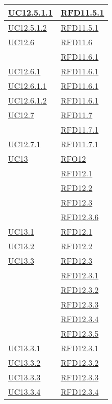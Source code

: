 \begin{longtable}{|>{\centering}m{5cm}|m{5cm}<{\centering}|}
\hyperref[UC12.5.1.1]{UC12.5.1.1} & \hyperlink{RFD11.5.1}{RFD11.5.1}\\ \hline
\hyperref[UC12.5.1.2]{UC12.5.1.2} & \hyperlink{RFD11.5.1}{RFD11.5.1}\\ \hline
\hyperref[UC12.6]{UC12.6} & \hyperlink{RFD11.6}{RFD11.6}\\
& \hyperlink{RFD11.6.1}{RFD11.6.1}\\ \hline
\hyperref[UC12.6.1]{UC12.6.1} & \hyperlink{RFD11.6.1}{RFD11.6.1}\\ \hline
\hyperref[UC12.6.1.1]{UC12.6.1.1} & \hyperlink{RFD11.6.1}{RFD11.6.1}\\ \hline
\hyperref[UC12.6.1.2]{UC12.6.1.2} & \hyperlink{RFD11.6.1}{RFD11.6.1}\\ \hline
\hyperref[UC12.7]{UC12.7} & \hyperlink{RFD11.7}{RFD11.7}\\
& \hyperlink{RFD11.7.1}{RFD11.7.1}\\ \hline
\hyperref[UC12.7.1]{UC12.7.1} & \hyperlink{RFD11.7.1}{RFD11.7.1}\\ \hline
\hyperref[UC13]{UC13} & \hyperlink{RFO12}{RFO12}\\
& \hyperlink{RFD12.1}{RFD12.1}\\
& \hyperlink{RFD12.2}{RFD12.2}\\
& \hyperlink{RFD12.3}{RFD12.3}\\
& \hyperlink{RFD12.3.6}{RFD12.3.6}\\ \hline
\hyperref[UC13.1]{UC13.1} & \hyperlink{RFD12.1}{RFD12.1}\\ \hline
\hyperref[UC13.2]{UC13.2} & \hyperlink{RFD12.2}{RFD12.2}\\ \hline
\hyperref[UC13.3]{UC13.3} & \hyperlink{RFD12.3}{RFD12.3}\\
& \hyperlink{RFD12.3.1}{RFD12.3.1}\\
& \hyperlink{RFD12.3.2}{RFD12.3.2}\\
& \hyperlink{RFD12.3.3}{RFD12.3.3}\\
& \hyperlink{RFD12.3.4}{RFD12.3.4}\\
& \hyperlink{RFD12.3.5}{RFD12.3.5}\\ \hline
\hyperref[UC13.3.1]{UC13.3.1} & \hyperlink{RFD12.3.1}{RFD12.3.1}\\ \hline
\hyperref[UC13.3.2]{UC13.3.2} & \hyperlink{RFD12.3.2}{RFD12.3.2}\\ \hline
\hyperref[UC13.3.3]{UC13.3.3} & \hyperlink{RFD12.3.3}{RFD12.3.3}\\ \hline
\hyperref[UC13.3.4]{UC13.3.4} & \hyperlink{RFD12.3.4}{RFD12.3.4}\\ \hline

\end{longtable}
